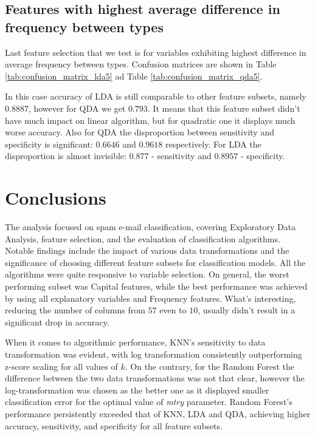 \documentclass{article}\usepackage[]{graphicx}\usepackage[]{xcolor}
\begin{document}
\subsection*{Features with highest average difference in frequency between types}
	 
Last feature selection that we test is for variables exhibiting highest difference in 
average frequency between types. Confusion matrices are shown in Table 
\ref{tab:confusion_matrix_lda5} ad Table \ref{tab:confusion_matrix_qda5}.
	 
In this case accuracy of LDA is still comparable to other feature subsets, namely 
$0.8887$, however for QDA we get $0.793$. It means that this feature subset didn't 
have much impact on linear algorithm, but for quadratic one it displays much worse accuracy. 
Also for QDA the disproportion between sensitivity and specificity is significant: 
$0.6646$ and $0.9618$ respectively. For LDA the disproportion is almost invisible: 
$0.877$ - sensitivity and $0.8957$ - specificity.

\section{Conclusions}

The analysis focused on spam e-mail classification, covering Exploratory Data Analysis, 
feature selection, and the evaluation of classification algorithms.
Notable findings include the impact of various data transformations and the 
significance of choosing different feature subsets for classification models.
All the algorithms were quite responsive to variable selection. On general, 
the worst performing subset was Capital features, while the best performance was
achieved by using all explanatory variables and Frequency features.
What's interesting, reducing the number of columns from $57$ even to $10$, usually
didn't result in a significant drop in accuracy. 

When it comes to algorithmic performance, KNN's sensitivity to data transformation 
was evident, with log transformation consistently outperforming z-score scaling for all values of $k$. 
On the contrary, for the Random Forest the difference between the two data transformations
was not that clear, however the log-transformation was chosen as the better one as it
displayed smaller classification error for the optimal value of \textit{mtry} parameter.
Random Forest's performance persistently exceeded that of KNN, LDA and QDA, achieving higher accuracy, 
sensitivity, and specificity for all feature subsets.
\end{document}
